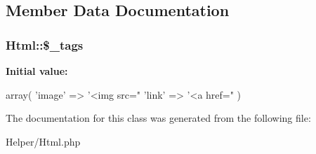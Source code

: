 \subsection{Member Data Documentation}
\hypertarget{classHtml_ae391dd5f6e8e263626f8ebdfd56e7e88}{
\subsubsection[{\$\_\-tags}]{\setlength{\rightskip}{0pt plus 5cm}Html::\$\_\-tags}}
\label{classHtml_ae391dd5f6e8e263626f8ebdfd56e7e88}
{\bfseries Initial value:}
\begin{DoxyCode}
 array(
                        'image' => '<img src="%
                        'link' => '<a href="%
                )
\end{DoxyCode}


The documentation for this class was generated from the following file:\begin{DoxyCompactItemize}
\item 
Helper/Html.php\end{DoxyCompactItemize}
